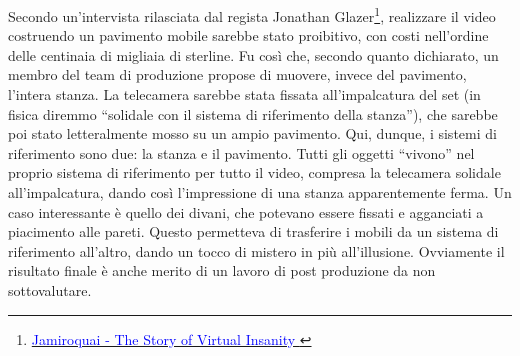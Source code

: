 Secondo un'intervista rilasciata dal regista Jonathan Glazer\footnote{\href{https://www.youtube.com/watch?v=nY6YwZzKzTI}{\textcolor{blue}{Jamiroquai - The Story of Virtual Insanity
}}}, realizzare il video costruendo un pavimento mobile sarebbe
stato proibitivo, con costi nell'ordine delle centinaia di migliaia
di sterline. Fu così che, secondo quanto dichiarato, un membro del team di produzione
propose di muovere, invece del pavimento, l'intera stanza.
La telecamera sarebbe stata fissata all'impalcatura del set
(in fisica diremmo ``solidale con il sistema di riferimento
della stanza''), che sarebbe poi stato letteralmente mosso
su un ampio pavimento.
Qui, dunque, i sistemi di riferimento sono due: la stanza e il
pavimento. Tutti gli oggetti ``vivono'' nel proprio sistema
di riferimento per tutto il video, compresa la telecamera solidale
all'impalcatura, dando così l'impressione di
una stanza apparentemente ferma. Un caso interessante è
quello dei divani, che potevano essere fissati e agganciati
a piacimento alle pareti. Questo permetteva di trasferire
i mobili da un sistema di riferimento all'altro, dando un
tocco di mistero in più all'illusione. Ovviamente il risultato finale
è anche merito di un lavoro di post produzione da non sottovalutare.

